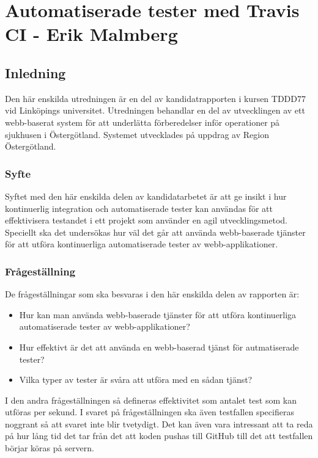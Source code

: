 \section{Automatiserade tester med Travis CI - Erik Malmberg}
\subsection{Inledning}
Den här enskilda utredningen är en del av kandidatrapporten i kursen TDDD77 vid Linköpings universitet.
Utredningen behandlar en del av utvecklingen av ett webb-baserat system för att underlätta förberedelser
inför operationer på sjukhusen i Östergötland. Systemet utvecklades på uppdrag av Region Östergötland.

\subsubsection{Syfte}
Syftet med den här enskilda delen av kandidatarbetet är att ge insikt 
i hur kontinuerlig integration och 
automatiserade tester kan användas för att effektivisera testandet 
i ett projekt som använder en agil 
utvecklingsmetod. Speciellt ska det undersökas hur väl det går att använda 
webb-baserade tjänster för
att utföra kontinuerliga automatiserade tester av webb-applikationer.

\subsubsection{Frågeställning}
De frågeställningar som ska besvaras i den här enskilda 
delen av rapporten är:

\begin{itemize}
\item Hur kan man använda webb-baserade tjänster för
att utföra kontinuerliga automatiserade tester av webb-applikationer?
\item Hur effektivt är det att använda en webb-baserad tjänst
för autmatiserade tester? 
\item Vilka typer av tester är svåra att utföra med en sådan tjänst?
\end{itemize}

I den andra frågeställningen så defineras effektivitet som antalet test som kan
utföras per sekund. I svaret på frågeställningen ska även testfallen 
specifieras noggrant så att svaret inte blir tvetydigt. Det kan även vara
intressant att ta reda på hur lång tid det tar från det att koden pushas till GitHub
till det att testfallen börjar köras på servern.

